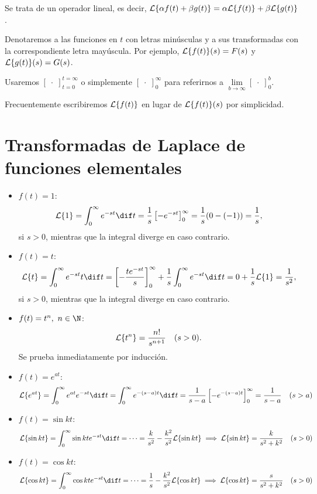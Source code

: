 \documentclass[../ecuaciones_diferenciales.tex]{subfiles}
\begin{document}
\begin{remark}
	Se trata de un operador lineal, es decir, \(\mathcal{L}\{\alpha f(t) + \beta g(t)\} =
	\alpha \mathcal{L}\{f(t)\} + \beta \mathcal{L}\{g(t)\}\).
\end{remark}

\begin{notation}
	Denotaremos a las funciones en \(t\) con letras minúsculas y
	a sus transformadas con la correspondiente letra mayúscula. Por
	ejemplo, \(\mathcal{L}\{f(t)\}(s) = F(s)\) y \(\mathcal{L}\{g(t)\}(s) = G(s)\).
\end{notation}

\begin{notation}
	Usaremos \([\;\cdot\;]_{t=0}^{t=\infty}\) o simplemente
	\([\;\cdot\;]_0^\infty\) para referirnos a
	\(\lim \limits_{b \to \infty} [\;\cdot\;]_0^b\).
\end{notation}

\begin{notation}
	Frecuentemente escribiremos \(\mathcal{L}\{f(t)\}\) en lugar de
	\(\mathcal{L}\{f(t)\}(s)\) por simplicidad.
\end{notation}

\section{Transformadas de Laplace de funciones elementales}

\begin{itemize}
	\item \(f(t) = 1\):
	      \[\L\{1\} = \int_0^\infty e^{-st} \dif t = \frac{1}{s}
		      \left[-e^{-st}\right]_0^\infty = \frac{1}{s}(0-(-1)) =
		      \frac{1}{s},\]
	      si \(s > 0\), mientras que la integral diverge en caso contrario.
	\item \(f(t) = t\):
	      \[\L\{t\} = \int_0^\infty e^{-st}t \dif t =
		      \left[-\frac{te^{-st}}{s}\right]_0^\infty + \frac{1}{s} \int_0^\infty
		      e^{-st} \dif t = 0 + \frac{1}{s} \L\{1\} = \frac{1}{s^2},\]
	      si \(s > 0\), mientras que la integral diverge en caso contrario.
	\item \(f(t) = t^n,\ n \in \N\):
	      \[\mathcal{L}\{t^n\} = \frac{n!}{s^{n+1}} \quad (s>0).\]
	      Se prueba inmediatamente por inducción.
	\item \(f(t) = e^{at}\):
	      \[\L\{e^{at}\} = \int_0^\infty e^{at}e^{-st} \dif t = \int_0^\infty
		      e^{-(s-a)t} \dif t = \frac{1}{s-a}\left[-e^{-(s-a)t}\right]_0^\infty =
		      \frac{1}{s-a} \quad (s>a)\]
	\item \(f(t) = \sin kt\):
	      \[\L\{\sin kt\} = \int_0^\infty \sin kt e^{-st} \dif t = \cdots = \frac{k}{s^2} -
		      \frac{k^2}{s^2} \L\{\sin kt\} \implies \L\{\sin kt\} = \frac{k}{s^2+k^2}
		      \quad (s>0)\]
	\item \(f(t) = \cos kt\):
	      \[\L\{\cos kt\} = \int_0^\infty \cos kt e^{-st} \dif t = \cdots = \frac{1}{s} -
		      \frac{k^2}{s^2}\L\{\cos kt\} \implies  \L\{\cos kt\} = \frac{s}{s^2+k^2}
		      \quad (s>0)\]
\end{itemize}
\end{document}
